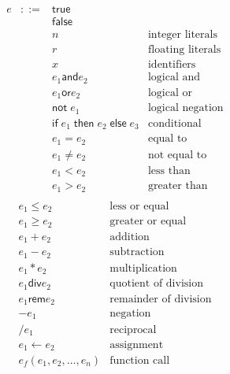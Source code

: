 \documentclass[11pt]{article}
\newcommand{\mathsc}[1]{\bm{\mathsf{#1}}}
\newcommand{\exprtrue}{\mathsc{true}}
\newcommand{\exprfalse}{\mathsc{false}}
\newcommand{\exprand}[2]{#1 \mathbin{\mathsc{and}} #2}
\newcommand{\expror}[2]{#1 \mathbin{\mathsc{or}} #2}
\newcommand{\exprnot}[1]{\mathsc{not}\;#1}
\newcommand{\exprif}[3]{\mathsc{if}\;#1\;\mathsc{then}\;#2\;\mathsc{else}\;#3}
\newcommand{\expreq}[2]{#1 = #2}
\newcommand{\exprne}[2]{#1 \neq #2}
\newcommand{\exprlt}[2]{#1 < #2}
\newcommand{\exprgt}[2]{#1 > #2}
\newcommand{\exprle}[2]{#1 \leq #2}
\newcommand{\exprge}[2]{#1 \geq #2}
\newcommand{\expradd}[2]{#1 + #2}
\newcommand{\exprsub}[2]{#1 - #2}
\newcommand{\exprmul}[2]{#1 * #2}
\newcommand{\exprquo}[2]{#1 \mathbin{\mathsc{div}} #2}
\newcommand{\exprrem}[2]{#1 \mathbin{\mathsc{rem}} #2}
\newcommand{\exprneg}[1]{-#1}
\newcommand{\exprrec}[1]{/#1}
\newcommand{\exprass}[2]{#1 \leftarrow #2}
\newcommand{\exprcall}[2]{#1(#2)}
\begin{document}
\begin{multicols}{2}
\[
\begin{array}{lcll}
e &::=& \exprtrue & \\
  &   & \exprfalse & \\
  &   & n & \text{integer literals}\\
  &   & r & \text{floating literals}\\
  &   & x & \text{identifiers}\\
  &   & \exprand{e_1}{e_2} & \text{logical and}\\
  &   & \expror{e_1}{e_2} &\text{logical or}\\
  &   & \exprnot{e_1} & \text{logical negation}\\
  &   & \exprif{e_1}{e_2}{e_3} & \text{conditional}\\
  &   & \expreq{e_1}{e_2} & \text{equal to}\\
  &   & \exprne{e_1}{e_2} & \text{not equal to}\\
  &   & \exprlt{e_1}{e_2} & \text{less than}\\
  &   & \exprgt{e_1}{e_2} & \text{greater than}\\
\end{array}
\]
\vfill
\columnbreak
\[
\begin{array}{lll}
        \exprle{e_1}{e_2} & \text{less or equal}\\
        \exprge{e_1}{e_2} & \text{greater or equal}\\
        \expradd{e_1}{e_2} & \text{addition}\\
        \exprsub{e_1}{e_2} & \text{subtraction}\\
        \exprmul{e_1}{e_2} & \text{multiplication}\\
        \exprquo{e_1}{e_2} & \text{quotient of division}\\
        \exprrem{e_1}{e_2} & \text{remainder of division}\\
        \exprneg{e_1} & \text{negation}\\
        \exprrec{e_1} & \text{reciprocal}\\
        \exprass{e_1}{e_2} & \text{assignment}\\
        \exprcall{e_f}{e_1, e_2, \ldots, e_n} & \text{function call}\\
\end{array}
\]
\end{multicols}
\end{document}
